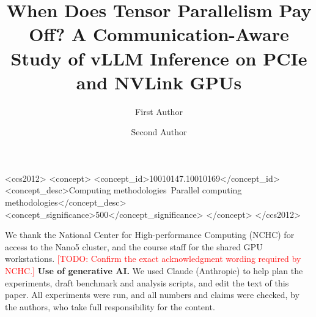 \documentclass[sigplan,10pt,anonymous]{acmart}
\newcommand{\todo}[1]{\textcolor{red}{[TODO: #1]}}
\begin{document}
\title[When Does Tensor Parallelism Pay Off?]{When Does Tensor Parallelism Pay Off? A Communication-Aware Study of vLLM Inference on PCIe and NVLink GPUs}

\author{First Author}

\author{Second Author}

\begin{abstract}

\end{abstract}

\begin{CCSXML}
<ccs2012>
   <concept>
       <concept_id>10010147.10010169</concept_id>
       <concept_desc>Computing methodologies~Parallel computing methodologies</concept_desc>
       <concept_significance>500</concept_significance>
   </concept>
</ccs2012>
\end{CCSXML}


\maketitle








\ifsubmission\else
  
\fi

\begin{acks}
We thank the National Center for High-performance Computing (NCHC) for access to the
Nano5 cluster, and the course staff for the shared GPU workstations.
\todo{Confirm the exact acknowledgment wording required by NCHC.}
\textbf{Use of generative AI.} We used Claude (Anthropic) to help plan the experiments,
draft benchmark and analysis scripts, and edit the text of this paper. All experiments
were run, and all numbers and claims were checked, by the authors, who take full
responsibility for the content.
\end{acks}



\end{document}
